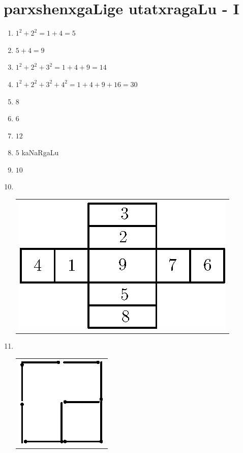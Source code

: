 \chapter{parxshenxgaLige utatxragaLu - {\rm I}}

\begin{enumerate}
  \renewcommand{\labelenumi}{\rm(\theenumi)}
    \itemsep=2pt
\item $1^2+ 2^2 = 1+4=5$

\item $5+4=9$

\item $1^2+2^2+3^2 = 1+4+9 =14$

\item $1^2 + 2^2 + 3^2+4^2 = 1+4+9+16 = 30$

\item $8$

\item $6$

\item $12$

\item $5$ kaNaRgaLu

\item $10$

\eject

\item
  ~

  \vskip -0.4cm
  
  \begin{tabular}[t]{l}
 \includegraphics{src/figures/ans10.eps}
\end{tabular}

  

\item 
~

  \vskip -0.6cm
  \begin{tabular}[t]{c}
\centering
\includegraphics{src/figures/ans11.eps}
\end{tabular}
\smallskip


\end{enumerate}
